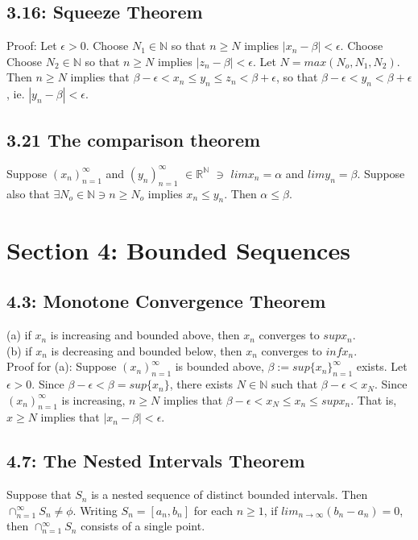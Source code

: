 \documentclass[10pt,letter]{report}
\begin{document}
\section*{3.16: Squeeze Theorem}
Proof: Let $\epsilon > 0$. Choose $N_1 \in\mathbb{N}$ so that $n\geq N$ implies $|x_n-\beta| < \epsilon$. Choose Choose $N_2 \in\mathbb{N}$ so that $n\geq N$ implies $|z_n-\beta| < \epsilon$. Let $N=max(N_o,N_1,N_2)$. Then $n\geq N$ implies that $\beta - \epsilon < x_n \leq y_n \leq z_n < \beta + \epsilon$, so that $\beta - \epsilon < y_n < \beta + \epsilon$, ie. $|y_n - \beta| < \epsilon$. 

\section*{3.21 The comparison theorem}
Suppose $(x_n)_{n=1}^\infty$ and $(y_n)_{n=1}^\infty$ $\in \mathbb{R}^\mathbb{N}$ $\ni$ $lim x_n = \alpha$ and $lim y_n = \beta$. Suppose also that $\exists N_o \in \mathbb{N} \ni n \geq N_o$ implies $x_n \leq y_n$. Then $\alpha \leq \beta$. \\ 



\chapter*{Section 4: Bounded Sequences}

\section*{4.3: Monotone Convergence Theorem}
(a) if $x_n$ is increasing and bounded above, then $x_n$ converges to $sup{x_n}$.\\ 
(b) if $x_n$ is decreasing and bounded below, then $x_n$ converges to $inf{x_n}$.\\ 
Proof for (a): Suppose $(x_n)_{n=1}^\infty$ is bounded above, $\beta:= sup\{x_n\}_{n=1}^\infty$ exists. Let $\epsilon > 0$. Since $\beta - \epsilon < \beta = sup\{x_n\}$, there exists $N \in \mathbb{N}$ such that $\beta - \epsilon < x_N$. Since $(x_n)_{n=1}^\infty$ is increasing, $n \geq N$ implies that $\beta - \epsilon < x_N \leq x_n \leq sup{x_n}$. That is, $x \geq N$ implies that $|x_n - \beta| < \epsilon$. 

\section*{4.7: The Nested Intervals Theorem}
Suppose that $S_n$ is a nested sequence of distinct bounded intervals. Then $\cap_{n=1}^\infty S_n \neq \phi$. Writing $S_n = [a_n, b_n]$ for each $n \geq 1$, if $lim_{n\rightarrow\infty}(b_n - a_n) = 0$, then $\cap_{n=1}^\infty S_n$ consists of a single point.
\end{document}
